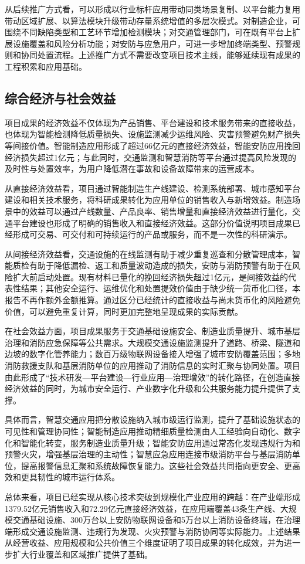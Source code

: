 从后续推广方式看，可以形成以行业标杆应用带动同类场景复制、以平台能力复用带动区域扩展、以算法模块升级带动存量系统增值的多层次模式。对制造企业，可围绕不同缺陷类型和工艺环节增加检测模块；对交通管理部门，可在既有平台上扩展设施覆盖和风险分析功能；对安防与应急用户，可进一步增加终端类型、预警规则和协同处置流程。上述推广方式不需要改变项目技术主线，能够延续现有成果的工程积累和应用基础。

\subsection{综合经济与社会效益}

项目成果的经济效益不仅体现为产品销售、平台建设和技术服务带来的直接收益，也体现为智能检测降低质量损失、设施监测减少运维风险、灾害预警避免财产损失等间接价值。智能制造应用形成了超过66亿元的直接经济效益，智能安防应用挽回经济损失超过1亿元；与此同时，交通监测和智慧消防等平台通过提高风险发现的及时性与处置效率，为用户降低潜在事故和设备故障带来的运营成本。

从直接经济效益看，项目通过智能制造生产线建设、检测系统部署、城市感知平台建设和相关技术服务，将科研成果转化为应用单位的销售收入与新增效益。制造场景中的效益可以通过产线数量、产品良率、销售增量和直接经济效益进行量化，交通平台建设也形成了明确的销售收入和直接经济效益。这部分价值说明项目成果已经形成可交易、可交付和可持续运行的产品或服务，而不是一次性的科研演示。

从间接经济效益看，交通设施的在线监测有助于减少重复巡查和分散管理成本，智能质检有助于降低漏检、返工和质量波动造成的损失，安防与消防预警有助于在风险扩大前启动处置。现有材料已量化的挽回经济损失超过1亿元，是间接效益的代表性结果；其他安全运行、运维优化和处置提效价值由于缺少统一货币化口径，本报告不再作额外金额推算。通过区分已经统计的直接收益与尚未货币化的风险避免价值，可以避免重复计算，同时更加完整地呈现成果的实际贡献。

在社会效益方面，项目成果服务于交通基础设施安全、制造业质量提升、城市基层治理和消防应急保障等公共需求。大规模交通设施监测提升了道路、桥梁、隧道和边坡的数字化管养能力；数百万级物联网设备接入增强了城市安防覆盖范围；多地消防救援支队和基层消防单位的应用推动了消防信息的实时汇聚与协同处置。项目由此形成了“技术研发---平台建设---行业应用---治理增效”的转化路径，在创造直接经济效益的同时，为城市安全运行、产业数字化升级和公共服务能力提升提供了支撑。

具体而言，智慧交通应用把分散设施纳入城市级运行监测，提升了基础设施状态的可见性和管理协同性；智能制造应用推动精细质量检测由人工经验向自动化、数字化和智能化转变，服务制造业质量升级；智能安防应用通过常态化发现违规行为和预警火灾，增强基层治理的主动性；智慧应急应用连接市级消防平台与基层消防单位，提高报警信息汇聚和系统故障恢复能力。这些社会效益共同指向更安全、更高效和更具韧性的城市运行体系。

总体来看，项目已经实现从核心技术突破到规模化产业应用的跨越：在产业端形成1379.52亿元销售收入和72.29亿元直接经济效益，在应用端覆盖43条生产线、大规模交通基础设施、300万台以上安防物联网设备和5万台以上消防设备终端，在治理端形成交通设施监测、违规行为发现、火灾预警与消防协同等实际能力。上述结果从经营收益、应用规模和公共价值三个维度证明了项目成果的转化成效，并为进一步扩大行业覆盖和区域推广提供了基础。
\clearpage
